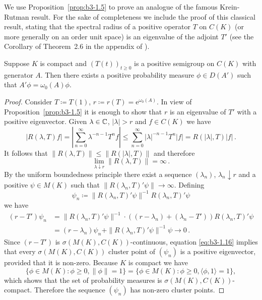 We use Proposition~\ref{prop:b3-1.5} to prove an analogue of the famous Krein-Rutman result.
For the sake of completeness we include the proof of this classical result, stating that the spectral radius of a positive operator $T$ on $C(K)$ (or more generally on an order unit space) is an eigenvalue of the adjoint $T'$ (see the Corollary of Theorem~2.6 in the appendix of \citet{schaefer:1966}).
\begin{theorem}\label{thm:b3-1.6}
	Suppose $K$ is compact and $(T(t))_{t \geq 0}$ is a positive semigroup on $C(K)$ with generator $A$.
	Then there exists a positive probability measure $\phi \in D(A')$ such that $A'\phi = \omega_{0}(A)\phi$.
\end{theorem}
\begin{proof}
	Consider $T \coloneqq T(1)$, $r \coloneqq r(T) = \mathrm{e}^{\omega_{0}(A)}$.
	In view of Proposition~\ref{prop:b3-1.5} it is enough to show that $r$ is an eigenvalue of $T'$ with a positive eigenvector.
	Given $\lambda \in \mathbb{C}$, $|\lambda| > r$ and $f \in C(K)$ we have
	\[
	|R(\lambda,T)f| = \left|\sum_{n=0}^{\infty} \lambda^{-n-1} T^{n}f\right| \leq \sum_{n=0}^{\infty} |\lambda|^{-n-1} T^{n}|f| = R(|\lambda|,T) |f|\,.
	\]
	It follows that $\|R(\lambda,T)\| \leq \|R(|\lambda|,T)\|$ and therefore
	\begin{equation}\label{eq:b3-1.15}
		\lim_{\lambda \downarrow r}\|R(\lambda,T)\| = \infty\,.
	\end{equation}
	By the uniform boundedness principle there exist a sequence $(\lambda_{n})$, $\lambda_{n} \downarrow r$ and a positive $\psi \in M(K)$ such that $\|R(\lambda_{n},T)'\psi\| \to \infty$.
	Defining 
    \[
    \psi_{n} \coloneqq \|R(\lambda_{n},T)'\psi\|^{-1}R(\lambda_{n},T)'\psi
    \] we have
	\begin{equation}\label{eq:b3-1.16}
		\begin{split}
		(r - T')\psi_{n} & = \|R(\lambda_{n},T)'\psi\|^{-1}\cdot((r-\lambda_{n}) + (\lambda_{n} - T'))R(\lambda_{n},T)'\psi\\ 
		& = (r-\lambda_{n})\psi_{n} + \|R(\lambda_{n},T)'\psi\|^{-1}\psi \to 0\,.
		\end{split}
	\end{equation}
	Since $(r - T')$ is $\sigma(M(K),C(K))$-continuous, equation \eqref{eq:b3-1.16} implies that every $\sigma(M(K),C(K))$ cluster point of $(\psi_{n})$ is a positive eigenvector, provided that it is non-zero.
	Because $K$ is compact we have 
%
\[
	\{\phi \in M(K) \colon \phi \geq 0, \|\phi\| = 1\} 
	= \{\phi \in M(K) \colon \phi \geq 0, \langle \phi,1 \rangle = 1\} , 
\]
which shows that the set of probability measures is $\sigma(M(K),C(K))$-compact.
	Therefore the sequence $(\psi_{n})$ has non-zero cluster points.
\end{proof}
